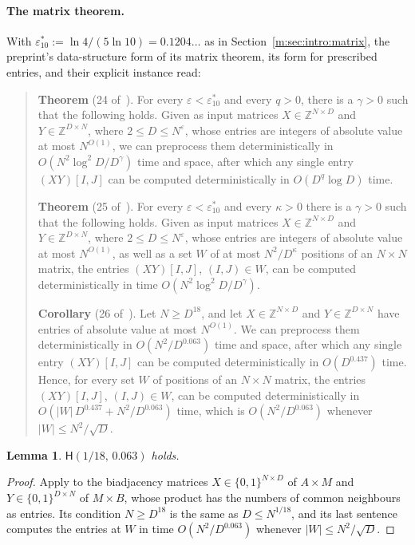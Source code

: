 \documentclass[11pt]{article}
\newtheorem{lemma}[theorem]{Lemma}
\theoremstyle{definition}
\theoremstyle{remark}
\newcommand{\Z}{\mathbb{Z}}
\newcommand{\et}{\varepsilon^*_{10}}
\newcommand{\Hyp}{\mathsf{H}}
\begin{document}
\paragraph{The matrix theorem.} With $\et:=\ln4/(5\ln10)=0.1204\ldots$ as in Section~\ref{m:sec:intro:matrix}, the preprint's data-structure form of its matrix theorem, its form for prescribed entries, and their explicit instance read:
\begin{quote}
\textbf{Theorem} (24 of~\cite{ZT}). For every $\varepsilon<\et$ and every $q>0$, there is a $\gamma>0$ such that the following holds. Given as input matrices $X\in\Z^{N\times D}$ and $Y\in\Z^{D\times N}$, where $2\le D\le N^\varepsilon$, whose entries are integers of absolute value at most $N^{O(1)}$, we can preprocess them deterministically in $O(N^2\log^2D/D^\gamma)$ time and space, after which any single entry $(XY)[I,J]$ can be computed deterministically in $O(D^q\log D)$ time.

\textbf{Theorem} (25 of~\cite{ZT}). For every $\varepsilon<\et$ and every $\kappa>0$ there is a $\gamma>0$ such that the following holds. Given as input matrices $X\in\Z^{N\times D}$ and $Y\in\Z^{D\times N}$, where $2\le D\le N^\varepsilon$, whose entries are integers of absolute value at most $N^{O(1)}$, as well as a set $W$ of at most $N^2/D^\kappa$ positions of an $N\times N$ matrix, the entries $(XY)[I,J]$, $(I,J)\in W$, can be computed deterministically in time $O(N^2\log^2D/D^\gamma)$.

\textbf{Corollary} (26 of~\cite{ZT}). Let $N\ge D^{18}$, and let $X\in\Z^{N\times D}$ and $Y\in\Z^{D\times N}$ have entries of absolute value at most $N^{O(1)}$. We can preprocess them deterministically in $O(N^2/D^{0.063})$ time and space, after which any single entry $(XY)[I,J]$ can be computed deterministically in $O(D^{0.437})$ time. Hence, for every set $W$ of positions of an $N\times N$ matrix, the entries $(XY)[I,J]$, $(I,J)\in W$, can be computed deterministically in $O(|W|\,D^{0.437}+N^2/D^{0.063})$ time, which is $O(N^2/D^{0.063})$ whenever $|W|\le N^2/\sqrt D$.
\end{quote}
\begin{lemma}\label{c:lem:hzt}
$\Hyp(1/18,\,0.063)$ holds.
\end{lemma}

\begin{proof}
Apply \cite[Corollary~26]{ZT} to the biadjacency matrices $X\in\{0,1\}^{N\times D}$ of $A\times M$ and $Y\in\{0,1\}^{D\times N}$ of $M\times B$, whose product has the numbers of common neighbours as entries. Its condition $N\ge D^{18}$ is the same as $D\le N^{1/18}$, and its last sentence computes the entries at $W$ in time $O(N^2/D^{0.063})$ whenever $|W|\le N^2/\sqrt D$.
\end{proof}
\end{document}
